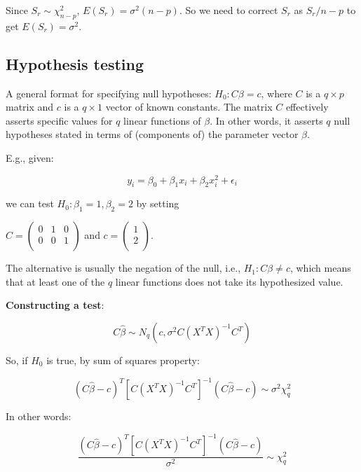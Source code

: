 Since $S_r\sim \chi^2_{n-p}$, $E(S_r)=\sigma^2 (n-p)$. So we need to correct $S_r$ as $S_r/n-p$ to get $E(S_r)=\sigma^2$. 

\subsection{Hypothesis testing}

A general format for specifying null hypotheses: $H_0: C\beta = c$, where $C$ is a $q\times p$ matrix and $c$ is a $q\times 1$ vector of known constants. The matrix $C$ effectively asserts specific values for $q$ linear functions of $\beta$. In other words, it asserts $q$ null hypotheses stated in terms of (components of) the parameter vector $\beta$.

 E.g., given:

\begin{equation}
y_i = \beta_0 + \beta_1 x_i + \beta_2 x_i^2+\epsilon_i
\end{equation}

\noindent
we can test $H_0: \beta_1=1, \beta_2=2$ by setting 

$C=\begin{pmatrix} 
0 & 1 & 0\\
0 & 0 & 1\\
\end{pmatrix}$
and $c=\begin{pmatrix} 
1\\
2\\
\end{pmatrix}$.

The alternative is usually the negation of the null, i.e., $H_1: C\beta\neq c$, which means that at least one of the $q$ linear functions does not take its hypothesized value. 

\textbf{Constructing a test}:

\begin{equation}
C\hat{\beta} \sim N_q (c,\sigma^2 C (X^T X)^{-1} C^T)
\end{equation}

So, if $H_0$ is true, by sum of squares property:

\begin{equation}
(C\hat{\beta} - c)^T [C (X^T X)^{-1} C^T]^{-1} (C\hat{\beta} - c) \sim \sigma^2 \chi_q^2
\end{equation}

In other words:

\begin{equation}
\frac{(C\hat{\beta} - c)^T [C (X^T X)^{-1} C^T]^{-1} (C\hat{\beta} - c)}{ \sigma^2} \sim \chi_q^2
\end{equation}


